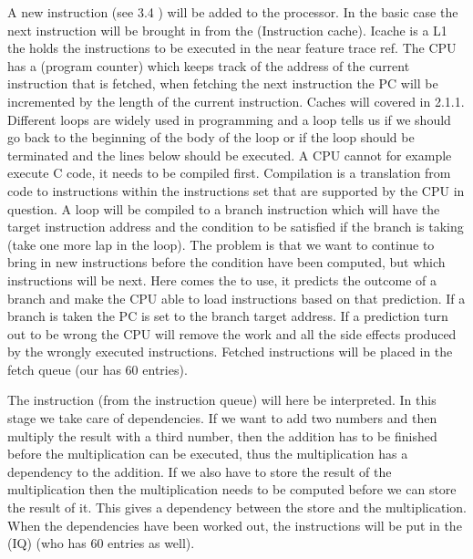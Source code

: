 A new instruction (see 3.4 \fixme) will be added to the processor. In the basic case the
next instruction will be brought in from the  (Instruction cache). Icache is
a L1  the holds the instructions to be executed in the near feature trace ref.
The CPU has a  (program counter) which keeps track of the address of the current
instruction that is fetched, when fetching the next instruction the PC will be
incremented by the length of the current instruction. Caches will covered in 2.1.1. \fixme
Different loops are widely used in programming and a loop tells us if we should go
back to the beginning of the body of the loop or if the loop should be terminated
and the lines below should be executed. A CPU cannot for example execute C code,
it needs to be compiled first. Compilation is a translation from code to instructions
within the instructions set that are supported by the CPU in question. A loop will
be compiled to a branch instruction which will have the target instruction address
and the condition to be satisfied if the branch is taking (take one more lap in the
loop). The problem is that we want to continue to bring in new instructions before
the condition have been computed, but which instructions will be next. Here comes
the  to use, it predicts the outcome of a branch and make the CPU
able to load instructions based on that prediction. If a branch is taken the PC is set
to the branch target address. If a prediction turn out to be wrong the CPU will remove
the work and all the side effects produced by the wrongly executed instructions.
Fetched instructions will be placed in the fetch queue (our has 60 entries).

The instruction (from the instruction queue) will here be interpreted.
In this stage we take care of dependencies. If we want to add two numbers and
then multiply the result with a third number, then the addition has to be finished
before the multiplication can be executed, thus the multiplication has a dependency
to the addition. If we also have to store the result of the multiplication then the
multiplication needs to be computed before we can store the result of it. This gives a
dependency between the store and the multiplication. When the dependencies have
been worked out, the instructions will be put in the  (IQ) (who
has 60 entries as well).

